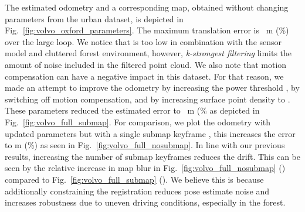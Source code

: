 The estimated odometry and a corresponding map, obtained without changing parameters from the urban dataset, is depicted in Fig.~\ref{fig:volvo_oxford_parameters}. The maximum translation error is ~m (\%) over the large loop. We notice that  is too low in combination with the sensor model and cluttered forest environment, however, \textit{k-strongest filtering} limits the amount of noise included in the filtered point cloud. We also note that motion compensation can have a negative impact in this dataset. For that reason, we made an attempt to improve the odometry by increasing the power threshold , by switching off motion compensation, and by increasing surface point density to . These parameters reduced the estimated error to ~m (\% as depicted in Fig.~\ref{fig:volvo_full_submap}. For comparison, we plot the odometry with updated parameters but with a single submap keyframe , this increases the error to m (\%) as seen in Fig.~\ref{fig:volvo_full_nosubmap}.
In line with our previous results, increasing the number of submap keyframes reduces the drift. This can be seen by the relative increase in map blur in Fig.~\ref{fig:volvo_full_nosubmap} () compared to Fig.~\ref{fig:volvo_full_submap} (). We believe this is because additionally constraining the registration reduces pose estimate noise and increases robustness due to uneven driving conditions, especially in the forest.



